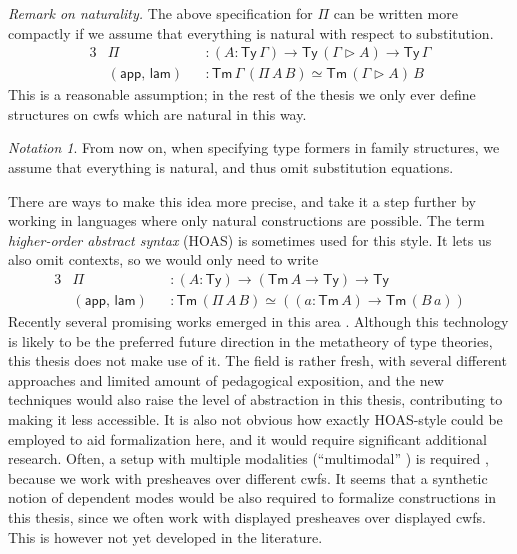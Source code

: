 \documentclass[12pt,a4paper,twoside,openany]{book}
\theoremstyle{remark}
\newtheorem{notation}{Notation}
\theoremstyle{definition}
\theoremstyle{theorem}
\newcommand{\ms}[1]{\mathsf{#1}}
\newcommand{\Tm}{\mathsf{Tm}}
\newcommand{\Ty}{\mathsf{Ty}}
\newcommand{\ext}{\triangleright}
\newcommand{\app}{\ms{app}}
\newcommand{\lam}{\ms{lam}}
\begin{document}
\emph{Remark on naturality.} The above specification for $\Pi$ can be written
more compactly if we assume that everything is natural with respect to
substitution.
\begin{alignat*}{3}
  &\Pi            &&: (A : \Ty\,\Gamma) \to \Ty\,(\Gamma\ext A) \to \Ty\,\Gamma\\
  & (\app,\,\lam) &&: \Tm\,\Gamma\,(\Pi\,A\,B) \simeq \Tm\,(\Gamma \ext A)\,B
\end{alignat*}
This is a reasonable assumption; in the rest of the thesis we only ever define
structures on cwfs which are natural in this way.

\begin{notation} From now on, when specifying type formers in family structures,
we assume that everything is natural, and thus omit substitution equations.
\end{notation}

There are ways to make this idea more precise, and take it a step further by
working in languages where only natural constructions are possible. The term
\emph{higher-order abstract syntax} (HOAS) is sometimes used for this style. It lets us
also omit contexts, so we would only need to write
\begin{alignat*}{3}
  &\Pi            &&: (A : \Ty) \to (\Tm\,A \to \Ty) \to \Ty\\
  & (\app,\,\lam) &&: \Tm\,(\Pi\,A\,B) \simeq ((a : \Tm\,A) \to \Tm\,(B\,a))
\end{alignat*}
Recently several promising works emerged in this area
\cite{uemura,ctt-normalization,bocquet2021induction}. Although this technology
is likely to be the preferred future direction in the metatheory of type
theories, this thesis does not make use of it. The field is rather fresh, with
several different approaches and limited amount of pedagogical exposition, and
the new techniques would also raise the level of abstraction in this thesis,
contributing to making it less accessible. It is also not obvious how exactly
HOAS-style could be employed to aid formalization here, and it would require
significant additional research.  Often, a setup with multiple modalities
(``multimodal'' \cite{gratzer20multimodal}) is required
\cite{bocquet2021induction}, because we work with presheaves over different
cwfs. It seems that a synthetic notion of dependent modes would be also required
to formalize constructions in this thesis, since we often work with displayed
presheaves over displayed cwfs. This is however not yet developed in the
literature.
\end{document}
